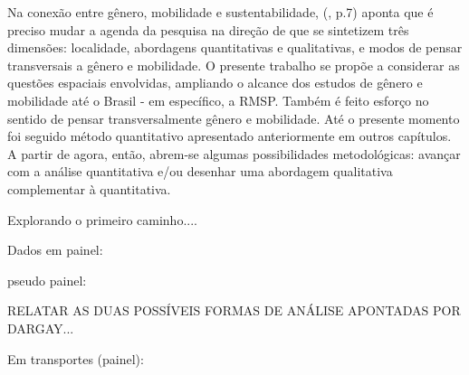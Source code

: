 

Na conexão entre gênero, mobilidade e sustentabilidade,  (\citeyear{HANSON2010}, p.7) aponta que é preciso mudar a agenda da pesquisa na direção de que se sintetizem três dimensões: localidade, abordagens quantitativas e qualitativas, e modos de pensar transversais a gênero e mobilidade. O presente trabalho se propõe a considerar as questões espaciais envolvidas, ampliando o alcance dos estudos de gênero e mobilidade até o Brasil - em específico, a RMSP. Também é feito esforço no sentido de pensar transversalmente gênero e mobilidade. Até o presente momento foi seguido método quantitativo apresentado anteriormente em outros capítulos. A partir de agora, então, abrem-se algumas possibilidades metodológicas: avançar com a análise quantitativa e/ou desenhar uma abordagem qualitativa complementar à quantitativa.

Explorando o primeiro caminho....



Dados em painel: \cite{DEATON1985,VERBEEK1992,VERBEEK1992,WOOLDRIDGE2002,FAVERO2013}

pseudo painel: \cite{WARUNSIRI2010,MENG2014,NETTO2014,NETTO2014a}

RELATAR AS DUAS POSSÍVEIS FORMAS DE ANÁLISE APONTADAS POR DARGAY...

Em transportes (painel): \cite{HANSON1985,MOFFITT1993,WIZEMAN2001,BEST2005,THOGERSEN2006,TRB2006,GLAESER2008,DIANA2010,SENER2011,
SCHEINER2013,COMPTOM2014,DICIOMMO2014,PERCHOUX2014,RASOULI2014}

